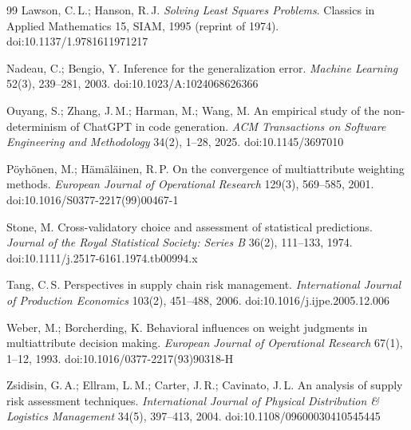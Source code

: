 \documentclass[10pt,twocolumn,a4paper]{article}
\begin{document}
\begin{thebibliography}{99}
 Lawson, C.\,L.; Hanson, R.\,J. \emph{Solving Least Squares
Problems}. Classics in Applied Mathematics 15, SIAM, 1995 (reprint of 1974).
doi:10.1137/1.9781611971217

 Nadeau, C.; Bengio, Y. Inference for the generalization error.
\emph{Machine Learning} 52(3), 239--281, 2003. doi:10.1023/A:1024068626366

 Ouyang, S.; Zhang, J.\,M.; Harman, M.; Wang, M. An empirical study
of the non-determinism of ChatGPT in code generation. \emph{ACM Transactions on Software
Engineering and Methodology} 34(2), 1--28, 2025. doi:10.1145/3697010

 P\"oyh\"onen, M.; H\"am\"al\"ainen, R.\,P. On the convergence of
multiattribute weighting methods. \emph{European Journal of Operational Research}
129(3), 569--585, 2001. doi:10.1016/S0377-2217(99)00467-1

 Stone, M. Cross-validatory choice and assessment of statistical
predictions. \emph{Journal of the Royal Statistical Society: Series B} 36(2), 111--133,
1974. doi:10.1111/j.2517-6161.1974.tb00994.x

 Tang, C.\,S. Perspectives in supply chain risk management.
\emph{International Journal of Production Economics} 103(2), 451--488, 2006.
doi:10.1016/j.ijpe.2005.12.006

 Weber, M.; Borcherding, K. Behavioral influences on weight judgments
in multiattribute decision making. \emph{European Journal of Operational Research}
67(1), 1--12, 1993. doi:10.1016/0377-2217(93)90318-H

 Zsidisin, G.\,A.; Ellram, L.\,M.; Carter, J.\,R.; Cavinato, J.\,L.
An analysis of supply risk assessment techniques. \emph{International Journal of Physical
Distribution \& Logistics Management} 34(5), 397--413, 2004.
doi:10.1108/09600030410545445

\end{thebibliography}
\end{document}
